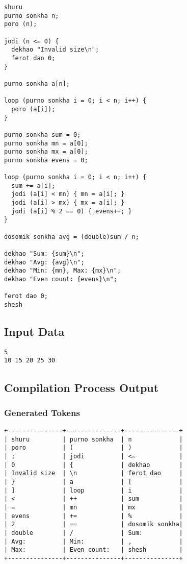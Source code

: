 \documentclass[12pt,a4paper]{article}
\begin{document}
\begin{lstlisting}[caption=Sample Input: main.banglish]
shuru
purno sonkha n;
poro (n);

jodi (n <= 0) {
  dekhao "Invalid size\n";
  ferot dao 0;
}

purno sonkha a[n];

loop (purno sonkha i = 0; i < n; i++) {
  poro (a[i]);
}

purno sonkha sum = 0;
purno sonkha mn = a[0];
purno sonkha mx = a[0];
purno sonkha evens = 0;

loop (purno sonkha i = 0; i < n; i++) {
  sum += a[i];
  jodi (a[i] < mn) { mn = a[i]; }
  jodi (a[i] > mx) { mx = a[i]; }
  jodi (a[i] % 2 == 0) { evens++; }
}

dosomik sonkha avg = (double)sum / n;

dekhao "Sum: {sum}\n";
dekhao "Avg: {avg}\n";
dekhao "Min: {mn}, Max: {mx}\n";
dekhao "Even count: {evens}\n";

ferot dao 0;
shesh
\end{lstlisting}

\subsection{Input Data}

\begin{lstlisting}[caption=Sample Input: input.txt]
5
10 15 20 25 30
\end{lstlisting}

\subsection{Compilation Process Output}

\subsubsection{Generated Tokens}

\begin{lstlisting}[caption=Output: output_tokens.txt]
+---------------+---------------+---------------+
| shuru         | purno sonkha  | n             |
| poro          | (             | )             |
| ;             | jodi          | <=            |
| 0             | {             | dekhao        |
| Invalid size  | \n            | ferot dao     |
| }             | a             | [             |
| ]             | loop          | i             |
| <             | ++            | sum           |
| =             | mn            | mx            |
| evens         | +=            | %             |
| 2             | ==            | dosomik sonkha|
| double        | /             | Sum:          |
| Avg:          | Min:          | ,             |
| Max:          | Even count:   | shesh         |
+---------------+---------------+---------------+
\end{lstlisting}
\end{document}

